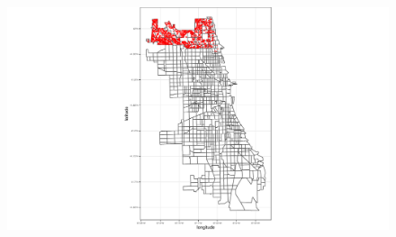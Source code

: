\documentclass[
  shownotes,
  xcolor={svgnames},
  hyperref={colorlinks,citecolor=DarkBlue,linkcolor=DarkRed,urlcolor=DarkBlue}
  ]{beamer}
\newenvironment{Shaded}{\begin{snugshade}}{\end{snugshade}}
\begin{document}
\begin{frame}[fragile]
\begin{minipage}[t]{0.48\linewidth}
\begin{itemize}
\begin{Shaded}
      \end{Shaded}
       \end{itemize} 
    \end{minipage}
    \hfill
    \begin{minipage}[t]{0.48\linewidth}%
    \bigskip
        \begin{figure}[H] \centering
            \captionsetup{justification=centering}  
            \includegraphics[scale=0.35]{figures/chicago.pdf}
    \end{figure}
    \end{minipage}
\end{frame}
\end{document}
